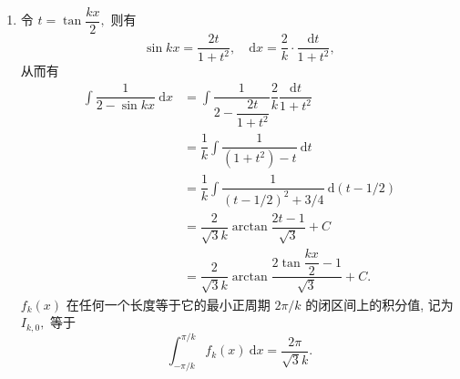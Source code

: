 \begin{solution}
\begin{enumerate}
\item 令 $t = \tan \dfrac{kx}{2},$ 则有
\begin{equation*}
\sin kx = \dfrac{2t}{1 + t^2}, \quad \mathrm{d} x = \dfrac{2}{k} \cdot \dfrac{\mathrm{d} t}{1 + t^2},
\end{equation*}
从而有
\begin{equation*}
\begin{aligned}
\int \dfrac{1}{2 - \sin kx} ~ \mathrm{d} x & = \int \dfrac{1}{2 - \dfrac{2t}{1 + t^2}} \dfrac{2}{k} \dfrac{\mathrm{d} t}{1 + t^2} \\
& = \dfrac{1}{k} \int \dfrac{1}{(1 + t^2) - t} ~ \mathrm{d} t \\
& = \dfrac{1}{k} \int \dfrac{1}{(t - 1/2)^2 + 3/4} ~ \mathrm{d} (t - 1/2) \\
& = \dfrac{2}{\sqrt{3} k} \arctan \dfrac{2t - 1}{\sqrt{3}} + C \\
& = \dfrac{2}{\sqrt{3} k} \arctan \dfrac{2 \tan \dfrac{kx}{2} - 1}{\sqrt{3}} + C.
\end{aligned}
\end{equation*}
$f_k(x)$ 在任何一个长度等于它的最小正周期 $2\pi/k$ 的闭区间上的积分值, 记为 $I_{k, 0},$ 等于
\begin{equation*}
\int_{-\pi/k}^{\pi/k} f_k(x) ~ \mathrm{d} x = \dfrac{2\pi}{\sqrt{3} k}.
\end{equation*}


\end{enumerate}
\end{solution}
